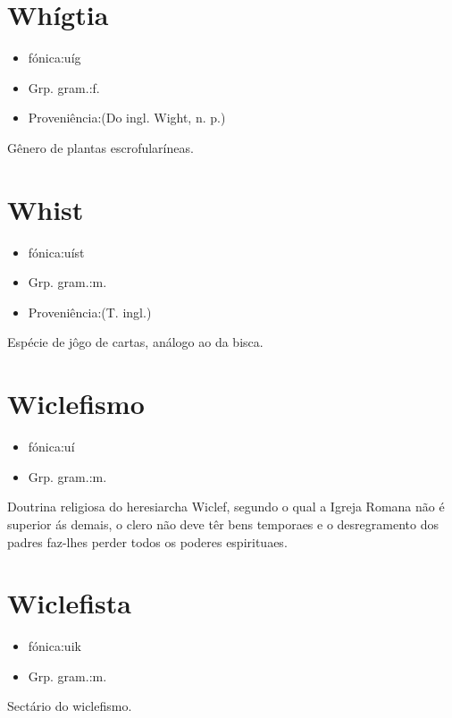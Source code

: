 \documentclass{article}
\begin{document}
\section{Whígtia}
\begin{itemize}
\item {fónica:uíg}
\end{itemize}
\begin{itemize}
\item {Grp. gram.:f.}
\end{itemize}
\begin{itemize}
\item {Proveniência:(Do ingl. \textunderscore Wight\textunderscore , n. p.)}
\end{itemize}
Gênero de plantas escrofularíneas.
\section{Whist}
\begin{itemize}
\item {fónica:uíst}
\end{itemize}
\begin{itemize}
\item {Grp. gram.:m.}
\end{itemize}
\begin{itemize}
\item {Proveniência:(T. ingl.)}
\end{itemize}
Espécie de jôgo de cartas, análogo ao da bisca.
\section{Wiclefismo}
\begin{itemize}
\item {fónica:uí}
\end{itemize}
\begin{itemize}
\item {Grp. gram.:m.}
\end{itemize}
Doutrina religiosa do heresiarcha Wiclef, segundo o qual a Igreja Romana não é superior ás demais, o clero não deve têr bens temporaes e o desregramento dos padres faz-lhes perder todos os poderes espirituaes.
\section{Wiclefista}
\begin{itemize}
\item {fónica:uik}
\end{itemize}
\begin{itemize}
\item {Grp. gram.:m.}
\end{itemize}
Sectário do wiclefismo.
\end{document}
